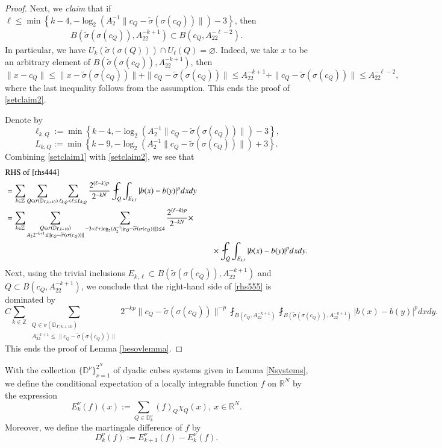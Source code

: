 \documentclass[12pt]{amsart}
\begin{document}
\begin{proof}
Next, we {\it claim} that if $\ell\leq \min\left\{k-4,-\log_2(A_2^{-1}\|c_Q-\widetilde{\sigma}(\sigma(c_Q))\|)-3\right\}$, then
\begin{align}\label{setclaim2}
B(\widetilde{\sigma}(\sigma(c_Q)),A_22^{-k+1})\subset B(c_Q,A_22^{-\ell-2}).
\end{align}
In particular, we have $U_k(\widetilde{\sigma}(\sigma(Q)))\cap U_{\ell}(Q)=\varnothing$. Indeed, we take $x$ to be an arbitrary element of $B(\widetilde{\sigma}(\sigma(c_Q)),A_22^{-k+1})$, then
$$\|x-c_Q\|\leq \|x-\widetilde{\sigma}(\sigma(c_Q))\|+\|c_Q-\widetilde{\sigma}(\sigma(c_Q))\|\leq A_22^{-k+1}+\|c_Q-\widetilde{\sigma}(\sigma(c_Q))\|\leq A_22^{-\ell-2},$$
where the last inequality follows from the assumption. This ends the proof of \eqref{setclaim2}.

Denote by $$\ell_{k,Q}:=\min\left\{k-4,-\log_2(A_2^{-1}\|c_Q-\widetilde{\sigma}(\sigma(c_Q))\|)-3\right\},$$
$$L_{k,Q}:=\min\left\{k-9,-\log_2(A_2^{-1}\|c_Q-\widetilde{\sigma}(\sigma(c_Q))\|)+3\right\}.$$
Combining \eqref{setclaim1} with \eqref{setclaim2}, we see that
\begin{align}\label{rhs555}
&{\rm RHS}\ {\rm of}\ \eqref{rhs444}\nonumber\\
&=\sum_{k\in\mathbb{Z}}\sum_{Q\in\sigma(\mathbb{D}_{\Gamma,k+10})}\sum_{\ell_{k,Q}<\ell\leq L_{k,Q}}\frac{2^{(\ell-k)p}}{2^{-kN}}\fint_{Q}\int_{E_{k,\ell}}|b(x)-b(y)|^pdxdy\nonumber\\
&= \sum_{k\in\mathbb{Z}}\sum_{{\substack{Q\in\sigma(\mathbb{D}_{\Gamma,k+10})\\ A_22^{-k+1}\leq \|c_Q-\widetilde{\sigma}(\sigma(c_Q))\|}}}\sum_{-3<\ell+\log_2(A_2^{-1}\|c_Q-\widetilde{\sigma}(\sigma(c_Q))\|)\leq 4}\frac{2^{(\ell-k)p}}{2^{-kN}}\times\nonumber\\
&\hspace{9.0cm}\times\fint_{Q}\int_{E_{k,\ell}}|b(x)-b(y)|^pdxdy.
\end{align}
Next, using the trivial inclusions
$E_{k,\ell}\subset B(\widetilde{\sigma}(\sigma(c_Q)),A_22^{-k+1})$ and $Q\subset B(c_Q,A_22^{-k+1})$,
we conclude that the right-hand side of \eqref{rhs555} is dominated by
$$C\sum_{k\in\mathbb{Z}}\sum_{{\substack{Q\in\sigma(\mathbb{D}_{\Gamma,k+10})\\ A_22^{-k+1}\leq \|c_Q-\widetilde{\sigma}(\sigma(c_Q))\|}}}2^{-kp}\|c_Q-\widetilde{\sigma}(\sigma(c_Q))\|^{-p}\fint_{B(c_Q,A_22^{-k+1})}\fint_{B(\widetilde{\sigma}(\sigma(c_Q)),A_22^{-k+1})}|b(x)-b(y)|^pdxdy.$$
This ends the proof of Lemma \ref{besovlemma}.
\end{proof}
With the collection $\{\mathbb{D}^\nu\}_{\nu=1}^{2^N}$ of dyadic cubes systems given in Lemma \ref{Nsystems}, we define the conditional expectation of a locally integrable function $f$ on $\mathbb{R}^N$ by the expression
$$E_k^\nu(f)(x):=\sum_{Q\in\mathbb{D}_k^\nu}(f)_Q\chi_Q(x),\ x\in\mathbb{R}^N.$$
Moreover, we define the martingale difference of $f$ by
\[
D_k^\nu (f):=E_{k+1}^\nu (f)-E_k^\nu (f).
\]
\end{document}
